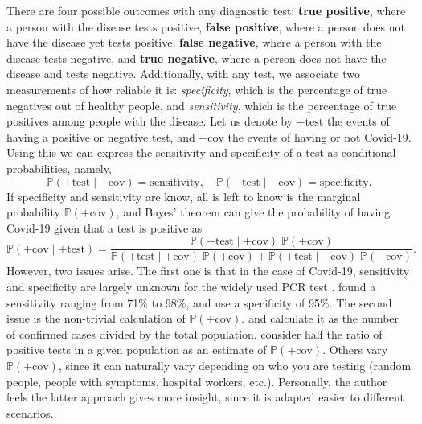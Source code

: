 \documentclass[letterpaper, 10 pt, conference]{article}
\newtheorem{thm}{Theorem}
\newcommand\N{\ensuremath{\mathbb{N}}}
\renewcommand{\P}{\ensuremath{\mathbb{P}}}
\newcommand\cov{\ensuremath{\mathrm{cov}}}
\newcommand\tst{\ensuremath{\mathrm{test}}}
\begin{document}
 There are four possible outcomes with any diagnostic test: \textbf{true positive}, where a person with the disease tests positive, \textbf{false positive}, where a person does not have the disease yet tests positive, \textbf{false negative}, where a person with the disease tests negative, and \textbf{true negative}, where a person does not have the disease and tests negative. Additionally, with any test, we associate two measurements of how reliable it is: \textit{specificity}, which is the percentage of true negatives out of healthy people, and \textit{sensitivity}, which is the percentage of true positives among people with the disease. Let us denote by $\pm \tst$ the events of having a positive or negative test, and $\pm \cov$ the events of having or not Covid-19. Using this we can express the sensitivity and specificity of a test as conditional probabilities, namely, 
 \begin{equation}
 	\P( +\tst \mid +\cov) = \text{sensitivity}, \quad \P( -\tst \mid -\cov) = \text{specificity}.
 \end{equation}
If specificity and sensitivity are know, all is left to know is the marginal probability $\P(+\cov)$, and Bayes' theorem can give the probability of having Covid-19 given that a test is positive as 
\begin{equation}
\P( +\cov \mid +\tst) = \frac{ \P(+\tst \mid +\cov)\; \P(+\cov) }{ \P(+\tst \mid +\cov) \; \P(+\cov) + \P(+\tst \mid -\cov) \; \P(-\cov)  }.
\end{equation} 
However, two issues arise. The first one is that in the case of Covid-19, sensitivity and specificity are largely unknown for the widely used PCR test \citep{West_Montori_Sampathkumar_2020}. \citet{pointer} found a sensitivity ranging from 71\% to 98\%, and use a specificity of 95\%. The second issue is the non-trivial calculation of $\P(+\cov)$.  \citet{towards_data_science_covid} and  \cite{significance_bayes} calculate it as the number of confirmed cases divided by the total population.  \citet{stat_bayes} consider half the ratio of positive tests in a given population as an estimate of $\P(+\cov)$. Others \citep{Chan2020, Good2020} vary $\P(+\cov)$, since it can naturally vary depending on who you are testing (random people, people with symptoms, hospital workers, etc.). Personally, the author feels the latter approach gives more insight, since it is adapted easier to different scenarios. 
\end{document}
